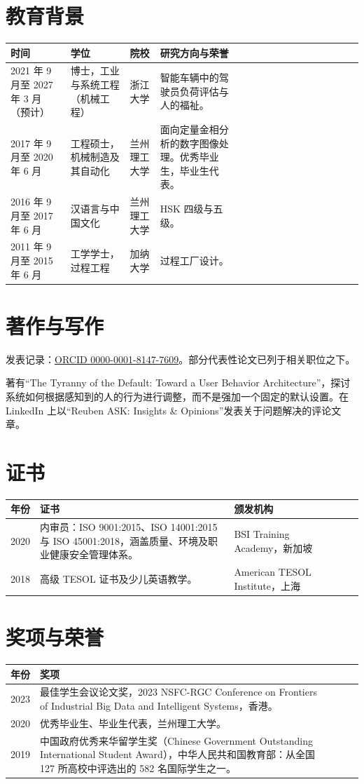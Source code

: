 \documentclass[10pt]{article}
\newcommand{\hd}[1]{\color{white}\bfseries #1}
\newcommand{\rowsep}{\\[3pt] \hline}
\begin{document}
\section*{教育背景}
{\fontsize{9.5}{11.5}\selectfont
\begin{longtable}{|P{26mm}|P{48mm}|P{36mm}|P{55.6mm}|}
\hline{} \hd{时间} & \hd{学位} & \hd{院校} & \hd{研究方向与荣誉} \rowsep
{} 2021 年 9 月至 2027 年 3 月（预计） & 博士，工业与系统工程（机械工程） & 浙江大学 & 智能车辆中的驾驶员负荷评估与人的福祉。 \rowsep
{} 2017 年 9 月至 2020 年 6 月 & 工程硕士，机械制造及其自动化 & 兰州理工大学 & 面向定量金相分析的数字图像处理。优秀毕业生，毕业生代表。 \rowsep
{} 2016 年 9 月至 2017 年 6 月 & 汉语言与中国文化 & 兰州理工大学 & HSK 四级与五级。 \rowsep
{} 2011 年 9 月至 2015 年 6 月 & 工学学士，过程工程 & 加纳大学 & 过程工厂设计。 \rowsep
\end{longtable}}

\section*{著作与写作}
发表记录：\href{https://orcid.org/0000-0001-8147-7609}{ORCID 0000-0001-8147-7609}。部分代表性论文已列于相关职位之下。

著有“The Tyranny of the Default: Toward a User Behavior Architecture”，探讨系统如何根据感知到的人的行为进行调整，而不是强加一个固定的默认设置。在 LinkedIn 上以“Reuben ASK: Insights \& Opinions”发表关于问题解决的评论文章。

\section*{证书}
{\fontsize{9.5}{11.5}\selectfont
\begin{longtable}{|P{16mm}|P{104mm}|P{50mm}|}
\hline{} \hd{年份} & \hd{证书} & \hd{颁发机构} \rowsep
{} 2020 & 内审员：ISO 9001:2015、ISO 14001:2015 与 ISO 45001:2018，涵盖质量、环境及职业健康安全管理体系。 & BSI Training Academy，新加坡 \rowsep
{} 2018 & 高级 TESOL 证书及少儿英语教学。 & American TESOL Institute，上海 \rowsep
\end{longtable}}

\section*{奖项与荣誉}
{\fontsize{9.5}{11.5}\selectfont
\begin{longtable}{|P{16mm}|P{157.6mm}|}
\hline{} \hd{年份} & \hd{奖项} \rowsep
{} 2023 & 最佳学生会议论文奖，2023 NSFC-RGC Conference on Frontiers of Industrial Big Data and Intelligent Systems，香港。 \rowsep
{} 2020 & 优秀毕业生、毕业生代表，兰州理工大学。 \rowsep
{} 2019 & 中国政府优秀来华留学生奖（Chinese Government Outstanding International Student Award），中华人民共和国教育部：从全国 127 所高校中评选出的 582 名国际学生之一。 \rowsep
\end{longtable}}
\end{document}
